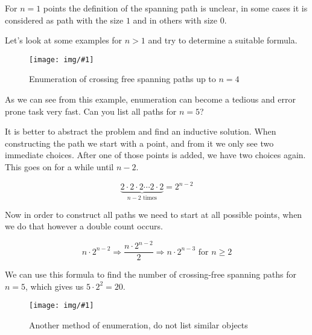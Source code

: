 \documentclass[12pt]{scrartcl}
\newcommand{\img}[3]{
\begin{figure}[H]
	\centering
	\texttt{[image: img/\#1]}
	\captionsetup{width=0.8\textwidth, justification=centering}
	\caption{#3}
\end{figure}
}
\newcommand{\eq}[1]{
\begin{equation*}
#1
\end{equation*}
}
\begin{document}
For $n=1$ points the definition of the spanning path is unclear, in some cases it is considered as path with the size $1$ and in others with size $0$.

Let's look at some examples for $n > 1$ and try to determine a suitable formula. 

\img{crossing_free_spanning_path_enumeration}
    {scale=1, trim=270 340 200 125}
    {Enumeration of crossing free spanning paths up to $n=4$}

As we can see from this example, enumeration can become a tedious and error prone task very fast. Can you list all paths for $n=5$?

It is better to abstract the problem and find an inductive solution. When constructing the path we start with a point, and from it we only see two immediate choices. After one of those points is added, we have two choices again. This goes on for a while until $n-2$.

\eq{\underbrace{2 \cdot 2 \cdot 2 \cdots 2 \cdot 2}_{n-2 \text{ times}} = 2^{n-2}}

Now in order to construct all paths we need to start at all possible points, when we do that however a double count occurs.

\eq{n \cdot 2^{n-2} \Rightarrow \frac{n \cdot 2^{n-2}}{2} \Rightarrow n \cdot 2^{n-3} \text{ for } n \ge 2 }

We can use this formula to find the number of crossing-free spanning paths for $n=5$, which gives us $5 \cdot 2^2 = 20$.

\img{crossing_free_spanning_path_n_5}
    {scale=1, trim=200 425 200 125}
    {Another method of enumeration, do not list similar objects}
\end{document}

